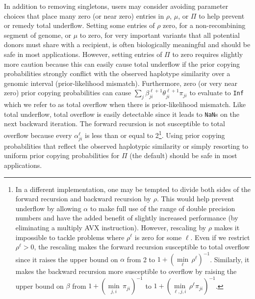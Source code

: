\documentclass[a4paper]{article}
\providecommand{\DIFadd}[1]{{\protect\color{blue}\uwave{#1}}} %
\providecommand{\DIFdel}[1]{{\protect\color{red}\sout{#1}}}                      %
\providecommand{\DIFaddbegin}{} %
\providecommand{\DIFaddend}{} %
\providecommand{\DIFdelbegin}{} %
\providecommand{\DIFdelend}{} %
\newcommand{\DIFscaledelfig}{0.5}
\newlength{\DIFdelgraphicswidth} %
\newlength{\DIFdelgraphicsheight} %
\newcommand{\DIFaddincludegraphics}[2][]{{\color{blue}\fbox{\DIFOincludegraphics[#1]{#2}}}} %
\newcommand{\DIFdelincludegraphics}[2][]{%
\sbox{\DIFdelgraphicsbox}{\DIFOincludegraphics[#1]{#2}}%
\settoboxwidth{\DIFdelgraphicswidth}{\DIFdelgraphicsbox} %
\settoboxtotalheight{\DIFdelgraphicsheight}{\DIFdelgraphicsbox} %
\scalebox{\DIFscaledelfig}{%
\parbox[b]{\DIFdelgraphicswidth}{\usebox{\DIFdelgraphicsbox}\\[-\baselineskip] \rule{\DIFdelgraphicswidth}{0em}}\llap{\resizebox{\DIFdelgraphicswidth}{\DIFdelgraphicsheight}{%
\setlength{\unitlength}{\DIFdelgraphicswidth}%
\begin{picture}(1,1)%
\thicklines\linethickness{2pt} %
{\color[rgb]{1,0,0}\put(0,0){\framebox(1,1){}}}%
{\color[rgb]{1,0,0}\put(0,0){\line( 1,1){1}}}%
{\color[rgb]{1,0,0}\put(0,1){\line(1,-1){1}}}%
\end{picture}%
}\hspace*{3pt}}} %
} %
\DeclareRobustCommand{\DIFaddbegin}{\DIFOaddbegin \let\includegraphics\DIFaddincludegraphics} %
\DeclareRobustCommand{\DIFaddend}{\DIFOaddend \let\includegraphics\DIFOincludegraphics} %
\DeclareRobustCommand{\DIFdelbegin}{\DIFOdelbegin \let\includegraphics\DIFdelincludegraphics} %
\DeclareRobustCommand{\DIFdelend}{\DIFOaddend \let\includegraphics\DIFOincludegraphics} %
\begin{document}
In addition to removing singletons, users may consider avoiding parameter choices that place many zero (or near zero) entries in \(\rho\), \(\mu\), or \(\Pi\) to help prevent or remedy total underflow.
Setting some entries of \(\rho\) zero, for a non-recombining segment of genome, or \(\mu\) to zero, for very important variants that all potential donors must share with a recipient, is often biologically meaningful and should be safe in most applications.
However, setting entries of \(\Pi\) to zero requires slightly more caution because this can easily cause total underflow if the prior copying probabilities strongly conflict with the observed haplotype similarity over a genomic interval (prior-likelihood mismatch).
Furthermore, zero (or very near zero) prior copying probabilities can cause \DIFdelbegin \DIFdel{\(\underset{j}{\sum} \beta_{ji}^{\ell+1}\theta_{ji}^{\ell+1} \pi_{ji}\) }\DIFdelend \DIFaddbegin \DIFadd{\(\underset{j}{\sum} \beta_{ji}^{\ell+1}\theta_{ji}^{\ell+1} \Pi_{ji}\) }\DIFaddend to evaluate to \texttt{Inf} which we refer to as total overflow when there is prior-likelihood mismatch.
Like total underflow, total overflow is easily detectable since it leads to \texttt{NaN}s on the next backward iteration.
The forward recursion is not susceptible to total overflow because every \(\alpha_{ji}^\ell\) is less than or equal to 2\footnote[2]{
  In a different implementation, one may be tempted to divide both sides of the forward recursion and backward recursion by \(\rho\).
  This would help prevent underflow by allowing \(\alpha\) to make full use of the range of double precision numbers and have the added benefit of slightly increased performance (by eliminating a multiply AVX instruction).
  However, rescaling by \(\rho\) makes it impossible to tackle problems where \(\rho^\ell\) is zero for some \(\ell\).
  Even if we restrict \(\rho^\ell > 0\), the rescaling makes the forward recursion susceptible to total overflow since it raises the upper bound on \(\alpha\) from 2 to \(1 + \left( \underset{\ell}{\min}\,\rho^\ell \right)^{-1}\).
	Similarly, it makes the backward recursion more susceptible to overflow by raising the upper bound on \(\beta\) from \DIFdelbegin \DIFdel{\(1 + \left( \underset{j,i}{\min}\,\pi_{ji} \right)^{-1}\) }\DIFdelend \DIFaddbegin \DIFadd{\(1 + \left( \underset{j,i}{\min}\,\Pi_{ji} \right)^{-1}\) }\DIFaddend to \DIFdelbegin \DIFdel{\(1 + \left( \underset{\ell,j,i}{\min}\,\rho^\ell \pi_{ji} \right)^{-1}\)}\DIFdelend \DIFaddbegin \DIFadd{\(1 + \left( \underset{\ell,j,i}{\min}\,\rho^\ell \Pi_{ji} \right)^{-1}\)}\DIFaddend .}.
Using prior copying probabilities that reflect the observed haplotypic similarity or simply resorting to uniform prior copying probabilities for \(\Pi\) (the default) should be safe in most applications.
\end{document}
